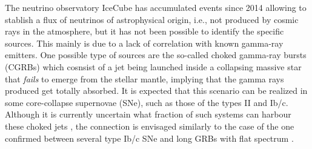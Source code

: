 \documentclass[baaa]{baaa}
\begin{document}
The neutrino observatory IceCube has accumulated events since 2014 allowing to stablish a flux of neutrinos of astrophysical origin, i.e., not produced by cosmic rays in the atmosphere, but it has not been possible to identify the specific sources. This mainly is due to a lack of correlation with known gamma-ray emitters. One possible type of sources are the so-called choked gamma-ray bursts (CGRBs) which cosnsist of a jet being launched inside a collapsing massive star that \textit{fails} to emerge from the stellar mantle, implying that the gamma rays produced get totally absorbed. It is expected that this scenario can be realized in some core-collapse supernovae (SNe), such as those of the types II \citep{macfadyen2001} and Ib/c. Although it is currently uncertain what fraction of such systems can harbour these choked jets \citep{piran2019}, the connection is envisaged similarly to the case of the one confirmed between several type Ib/c SNe and long GRBs with flat spectrum \citep{hjorth2011}.

 
\end{document}
